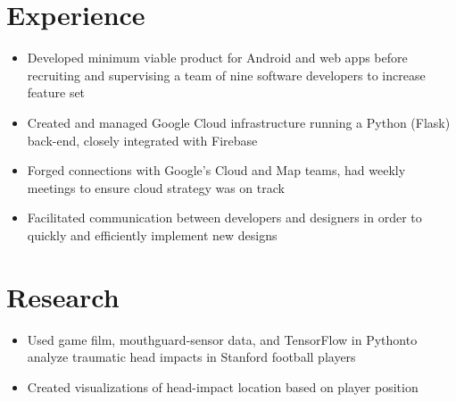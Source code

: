 \documentclass[]{deedy-resume-openfont}
\begin{document}
\hfill
\begin{minipage}[t]{0.66\textwidth}


\section{Experience}

\begin{itemize}
\item Developed minimum viable product for ​Android​ and ​web​ apps before recruiting and supervising a team of nine software developers to increase feature set
\item Created and managed ​Google Cloud​ infrastructure running a ​Python (Flask)​ back-end, closely integrated with ​Firebase
\item Forged connections with Google’s ​Cloud​ and ​Map​ teams, had weekly meetings to ensure cloud strategy was on track
\item Facilitated communication between developers and designers in order to quickly and efficiently implement new designs
\end{itemize}
\sectionsep


\section{Research}
\begin{itemize}
\item Used game film, mouthguard-sensor data, and ​TensorFlow​ in ​Python ​to analyze traumatic head impacts in Stanford football players
\item Created visualizations of head-impact location based on player position
\end{itemize}
\sectionsep

\end{minipage}
\end{document}
